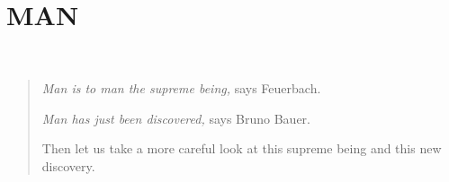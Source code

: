 \chapter[Part First: Man]{\\
MAN}

\newpage{}

~

\vspace{200pt}

\begin{quote}

\textit{Man is to man the supreme being,} says Feuerbach.

\textit{Man has just been discovered,} says Bruno Bauer.

Then let us take a more careful look at this supreme being and this new 
discovery.

\end{quote}

\medskip{}
